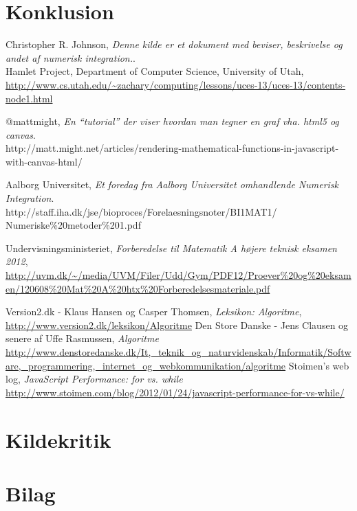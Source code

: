\documentclass[12pt]{article}
\numberwithin{equation}{section}
\begin{document}
\section{Konklusion}

\clearpage
{}
\begin{thebibliography}{9}

  	Christopher R. Johnson,
  	\emph{Denne kilde er et dokument med beviser, beskrivelse og andet af numerisk integration.}.\\
  	Hamlet Project, 
  	Department of Computer Science,
	University of Utah,
	\url{http://www.cs.utah.edu/~zachary/computing/lessons/uces-13/uces-13/contents-node1.html}
	
	@mattmight,
	\emph{En ``tutorial'' der viser hvordan man tegner en graf vha. html5 og canvas}.\\
	http://matt.might.net/articles/rendering-mathematical-functions-in-javascript-with-canvas-html/

	Aalborg Universitet,
	\emph{Et foredag fra Aalborg Universitet omhandlende Numerisk Integration}.\\
	http://staff.iha.dk/jse/bioproces/Forelaesningsnoter/BI1MAT1/\\Numeriske\%20metoder\%201.pdf
	
	Undervisningsministeriet,
	\emph{Forberedelse til Matematik A højere teknisk eksamen 2012},
	\url{http://uvm.dk/~/media/UVM/Filer/Udd/Gym/PDF12/Proever\%20og\%20eksamen/120608\%20Mat\%20A\%20htx\%20Forberedelsesmateriale.pdf}
	
	Version2.dk - Klaus Hansen og Casper Thomsen,
	\emph{Leksikon: Algoritme},
	\url{http://www.version2.dk/leksikon/Algoritme}
	Den Store Danske - Jens Clausen og senere af Uffe Rasmussen,
	\emph{Algoritme}
	\url{http://www.denstoredanske.dk/It,_teknik_og_naturvidenskab/Informatik/Software,_programmering,_internet_og_webkommunikation/algoritme}
	Stoimen's web log,
	\emph{JavaScript Performance: for vs. while}
	\url{http://www.stoimen.com/blog/2012/01/24/javascript-performance-for-vs-while/}
\end{thebibliography}

\section{Kildekritik}
\section{Bilag}
\end{document}
